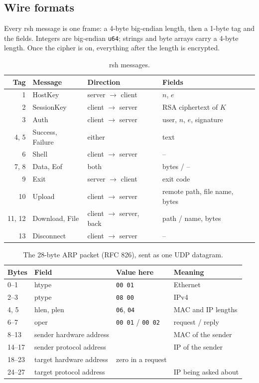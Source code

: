 \documentclass[11pt,a4paper]{article}
\begin{document}
\subsection{Wire formats}

Every rsh message is one frame: a 4-byte big-endian length, then a 1-byte tag
and the fields. Integers are big-endian \texttt{u64}; strings and byte arrays
carry a 4-byte length. Once the cipher is on, everything after the length is
encrypted.

\begin{table}[H]
\centering
\small
\begin{tabular}{@{}r >{\ttfamily}l l l@{}}
\toprule
Tag & \normalfont Message & Direction & Fields \\
\midrule
1  & HostKey     & server $\to$ client & $n$, $e$ \\
2  & SessionKey  & client $\to$ server & RSA ciphertext of $K$ \\
3  & Auth        & client $\to$ server & user, $n$, $e$, signature \\
4, 5 & Success, Failure & either      & text \\
6  & Shell       & client $\to$ server & -- \\
7, 8 & Data, Eof & both                & bytes / -- \\
9  & Exit        & server $\to$ client & exit code \\
10 & Upload      & client $\to$ server & remote path, file name, bytes \\
11, 12 & Download, File & client $\to$ server, back & path / name, bytes \\
13 & Disconnect  & client $\to$ server & -- \\
\bottomrule
\end{tabular}
\caption{rsh messages.}
\end{table}

\begin{table}[H]
\centering
\small
\begin{tabular}{@{}l l l l@{}}
\toprule
Bytes & Field & Value here & Meaning \\
\midrule
0--1   & htype & \texttt{00 01} & Ethernet \\
2--3   & ptype & \texttt{08 00} & IPv4 \\
4, 5   & hlen, plen & \texttt{06}, \texttt{04} & MAC and IP lengths \\
6--7   & oper  & \texttt{00 01} / \texttt{00 02} & request / reply \\
8--13  & sender hardware address & & MAC of the sender \\
14--17 & sender protocol address & & IP of the sender \\
18--23 & target hardware address & zero in a request & \\
24--27 & target protocol address & & IP being asked about \\
\bottomrule
\end{tabular}
\caption{The 28-byte ARP packet (RFC 826), sent as one UDP datagram.}
\end{table}
\end{document}
